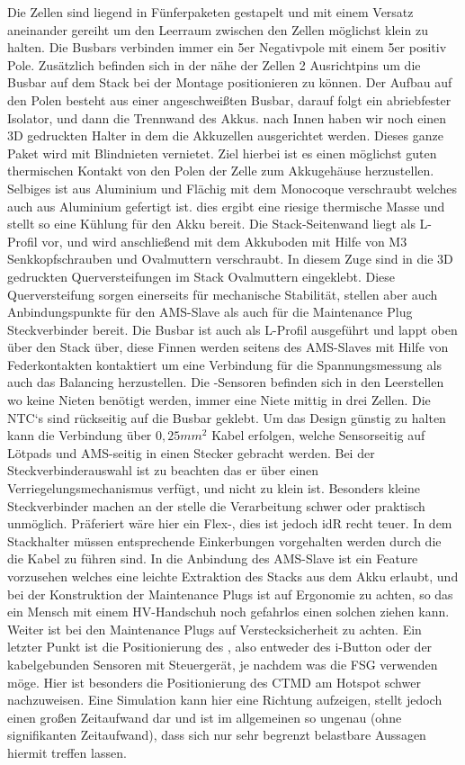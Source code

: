 Die Zellen sind liegend in Fünferpaketen gestapelt und mit einem Versatz aneinander gereiht um den Leerraum zwischen den Zellen möglichst klein zu halten. Die Busbars verbinden immer ein 5er Negativpole mit einem 5er positiv Pole. Zusätzlich befinden sich in der nähe der Zellen 2 Ausrichtpins um die Busbar auf dem Stack bei der Montage positionieren zu können. Der Aufbau auf den Polen besteht aus einer angeschweißten Busbar, darauf folgt ein abriebfester Isolator, und dann die Trennwand des Akkus. nach Innen haben wir noch einen 3D gedruckten Halter in dem die Akkuzellen ausgerichtet werden. Dieses ganze Paket wird mit Blindnieten vernietet. Ziel hierbei ist es einen möglichst guten thermischen Kontakt von den Polen der Zelle zum Akkugehäuse herzustellen. Selbiges ist aus Aluminium und Flächig mit dem Monocoque verschraubt welches auch aus Aluminium gefertigt ist. dies ergibt eine riesige thermische Masse und stellt so eine Kühlung für den Akku bereit. Die Stack-Seitenwand liegt als L-Profil vor, und wird anschließend mit dem Akkuboden mit Hilfe von M3 Senkkopfschrauben und Ovalmuttern verschraubt. In diesem Zuge sind in die 3D gedruckten Querversteifungen im Stack Ovalmuttern eingeklebt. Diese Querversteifung sorgen einerseits für mechanische Stabilität, stellen aber auch Anbindungspunkte für den \ac{AMS}-Slave als auch für die Maintenance Plug Steckverbinder bereit. Die Busbar ist auch als L-Profil ausgeführt und lappt oben über den Stack über, diese Finnen werden seitens des \ac{AMS}-Slaves mit Hilfe von Federkontakten kontaktiert um eine Verbindung für die Spannungsmessung als auch das Balancing herzustellen. Die -Sensoren befinden sich in den Leerstellen wo keine Nieten benötigt werden, immer eine Niete mittig in drei Zellen. Die \ac{NTC}`s sind rückseitig auf die Busbar geklebt. Um das Design günstig zu halten kann die Verbindung über \ensuremath{0,25mm^2} Kabel erfolgen, welche Sensorseitig auf Lötpads und \ac{AMS}-seitig in einen Stecker gebracht werden. Bei der Steckverbinderauswahl ist zu beachten das er über einen Verriegelungsmechanismus verfügt, und nicht zu klein ist. Besonders kleine Steckverbinder machen an der stelle die Verarbeitung schwer oder praktisch unmöglich. Präferiert wäre hier ein Flex-, dies ist jedoch \ac{idR} recht teuer. In dem Stackhalter müssen entsprechende Einkerbungen vorgehalten werden durch die die Kabel zu führen sind. In die Anbindung des \ac{AMS}-Slave ist ein Feature vorzusehen welches eine leichte Extraktion des Stacks aus dem Akku erlaubt, und bei der Konstruktion der Maintenance Plugs ist auf Ergonomie zu achten, so das ein Mensch mit einem \ac{HV}-Handschuh noch gefahrlos einen solchen ziehen kann. Weiter ist bei den Maintenance Plugs auf Verstecksicherheit zu achten. Ein letzter Punkt ist die Positionierung des , also entweder des i-Button oder der kabelgebunden Sensoren mit Steuergerät, je nachdem was die \ac{FSG} verwenden möge. Hier ist besonders die Positionierung des \ac{CTMD} am Hotspot schwer nachzuweisen. Eine Simulation kann hier eine Richtung aufzeigen, stellt jedoch einen großen Zeitaufwand dar und ist im allgemeinen so ungenau (ohne signifikanten Zeitaufwand), dass sich nur sehr begrenzt belastbare Aussagen hiermit treffen lassen.

